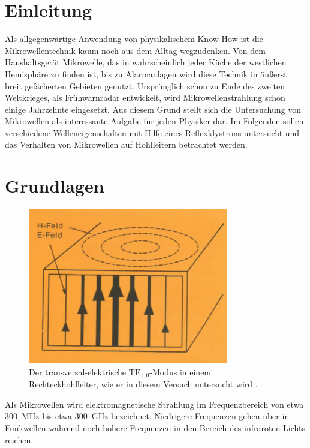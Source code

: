 \section{Einleitung}
\label{sec:einleitung}
Als allgegenwärtige Anwendung von physikalischem Know-How ist die
Mikrowellentechnik kaum noch aus dem Alltag wegzudenken.
Von dem Haushaltsgerät Mikrowelle, das in wahrscheinlich jeder Küche der
westlichen Hemisphäre zu finden ist, bis zu Alarmanlagen wird diese Technik
in äußerst breit gefächerten Gebieten genutzt.
Ursprünglich schon zu Ende des zweiten Weltkrieges, als Frühwarnradar
entwickelt, wird Mikrowellenstrahlung schon einige Jahrzehnte eingesetzt.
Aus diesem Grund stellt sich die Untersuchung von Mikrowellen als interessante
Aufgabe für jeden Physiker dar.
Im Folgenden sollen verschiedene Welleneigenschaften mit Hilfe eines
Reflexklystrons untersucht und das Verhalten von Mikrowellen auf Hohlleitern
betrachtet werden.

\section{Grundlagen}
\label{sec:grundlagen}
\begin{figure}
    \centering
    \includegraphics[width=0.9\linewidth]{img/hohlleiter.png}
    \caption{
        Der transversal-elektrische $\text{TE}_{1,0}$-Modus in einem
        Rechteckhohlleiter, wie er in diesem Versuch untersucht wird
        \cite{V53}.
    }
    \label{fig:leiter}
\end{figure}
Als Mikrowellen wird elektromagnetische Strahlung im Frequenzbereich
von etwa \SI{300}{\mega \hertz} bis etwa \SI{300}{\giga \hertz} bezeichnet.
Niedrigere Frequenzen gehen über in Funkwellen während noch höhere Frequenzen
in den Bereich des infraroten Lichts reichen.

